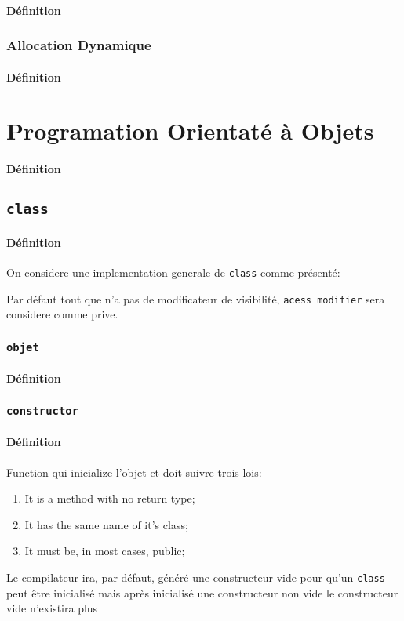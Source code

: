 \documentclass{article}
\begin{document}
\paragraph{Définition}

\subsubsection{Allocation Dynamique}
\paragraph{Définition}


\section{Programation Orientaté à Objets}
\paragraph{Définition}

\subsection{\texttt{class}}
\paragraph{Définition}On considere une implementation generale de \texttt{class} comme présenté:
\begin{scriptsize}
    \mycode
\end{scriptsize}
Par défaut tout que n'a pas de modificateur de visibilité, \texttt{acess modifier} sera considere comme prive.


\subsubsection{\texttt{objet}}
\paragraph{Définition}

\subsubsection{\texttt{constructor}}
\paragraph{Définition}Function qui inicialize l'objet et doit suivre trois lois:
\begin{enumerate}[noitemsep]
    \item It is a method with no return type;
    \item It has the same name of it's class;
    \item It must be, in most cases, public;
\end{enumerate}
Le compilateur ira, par défaut, généré une constructeur vide pour qu'un \texttt{class} peut être inicialisé mais après inicialisé une constructeur non vide le constructeur vide n'existira plus
\end{document}
